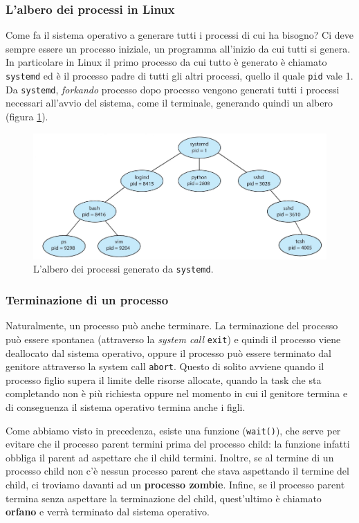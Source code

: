 %
\subsubsection{L'albero dei processi in Linux}
Come fa il sistema operativo a generare tutti i processi di cui ha bisogno? Ci deve sempre essere un processo iniziale, un programma all'inizio da cui tutti si genera. In particolare in Linux il primo processo da cui tutto è generato è chiamato \texttt{systemd} ed è il processo padre di tutti gli altri processi, quello il quale \texttt{pid} vale 1. Da \texttt{systemd}, \textit{forkando} processo dopo processo vengono generati tutti i processi necessari all'avvio del sistema, come il terminale, generando quindi un albero (figura \ref{fig:three_of_processes}).

\begin{figure}[h]
    \centering
    \includegraphics[width = .6\textwidth]{../res/imgs/processes/three_of_processes.png}
    \caption{L'albero dei processi generato da \texttt{systemd}.}
    \label{fig:three_of_processes}
\end{figure}

% 
\subsubsection{Terminazione di un processo}
Naturalmente, un processo può anche terminare. La terminazione del processo può essere spontanea (attraverso la \textit{system call} \texttt{exit}) e quindi il processo viene deallocato dal sistema operativo, oppure il processo può essere terminato dal genitore attraverso la system call \texttt{abort}. Questo di solito avviene quando il processo figlio supera il limite delle risorse allocate, quando la task che sta completando non è più richiesta oppure nel momento in cui il genitore termina e di conseguenza il sistema operativo termina anche i figli.

Come abbiamo visto in precedenza, esiste una funzione (\texttt{wait()}), che serve per evitare che il processo parent termini prima del processo child: la funzione infatti obbliga il parent ad aspettare che il child termini. Inoltre, se al termine di un processo child non c'è nessun processo parent che stava aspettando il termine del child, ci troviamo davanti ad un \textbf{processo zombie}. Infine, se il processo parent termina senza aspettare la terminazione del child, quest'ultimo è chiamato \textbf{orfano} e verrà terminato dal sistema operativo.

